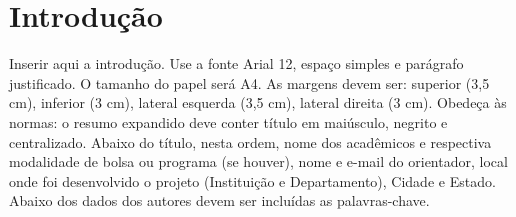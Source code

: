 \section{Introdução}

Inserir aqui a introdução. Use a fonte Arial 12, espaço simples e parágrafo justificado. O tamanho do papel será A4. As margens devem ser: superior (3,5 cm), inferior (3 cm), lateral esquerda (3,5 cm), lateral direita (3 cm). Obedeça às normas: o resumo expandido deve conter título em maiúsculo, negrito e centralizado. Abaixo do título, nesta ordem, nome dos acadêmicos e respectiva modalidade de bolsa ou programa (se houver), nome e e-mail do orientador, local onde foi desenvolvido o projeto (Instituição e Departamento), Cidade e Estado. Abaixo dos dados dos autores devem ser incluídas as palavras-chave.
